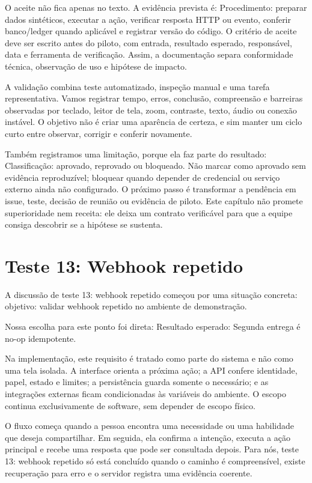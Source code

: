 \documentclass[12pt,oneside,a4paper,article]{abntex2}
\begin{document}
O aceite não fica apenas no texto. A evidência prevista é: Procedimento: preparar dados sintéticos, executar a ação, verificar resposta HTTP ou evento, conferir banco/ledger quando aplicável e registrar versão do código. O critério de aceite deve ser escrito antes do piloto, com entrada, resultado esperado, responsável, data e ferramenta de verificação. Assim, a documentação separa conformidade técnica, observação de uso e hipótese de impacto.

A validação combina teste automatizado, inspeção manual e uma tarefa representativa. Vamos registrar tempo, erros, conclusão, compreensão e barreiras observadas por teclado, leitor de tela, zoom, contraste, texto, áudio ou conexão instável. O objetivo não é criar uma aparência de certeza, e sim manter um ciclo curto entre observar, corrigir e conferir novamente.

Também registramos uma limitação, porque ela faz parte do resultado: Classificação: aprovado, reprovado ou bloqueado. Não marcar como aprovado sem evidência reproduzível; bloquear quando depender de credencial ou serviço externo ainda não configurado. O próximo passo é transformar a pendência em issue, teste, decisão de reunião ou evidência de piloto. Este capítulo não promete superioridade nem receita: ele deixa um contrato verificável para que a equipe consiga descobrir se a hipótese se sustenta.

\section{Teste 13: Webhook repetido}
A discussão de teste 13: webhook repetido começou por uma situação concreta: objetivo: validar webhook repetido no ambiente de demonstração.

Nossa escolha para este ponto foi direta: Resultado esperado: Segunda entrega é no-op idempotente.

Na implementação, este requisito é tratado como parte do sistema e não como uma tela isolada. A interface orienta a próxima ação; a API confere identidade, papel, estado e limites; a persistência guarda somente o necessário; e as integrações externas ficam condicionadas às variáveis do ambiente. O escopo continua exclusivamente de software, sem depender de escopo físico.

O fluxo começa quando a pessoa encontra uma necessidade ou uma habilidade que deseja compartilhar. Em seguida, ela confirma a intenção, executa a ação principal e recebe uma resposta que pode ser consultada depois. Para nós, teste 13: webhook repetido só está concluído quando o caminho é compreensível, existe recuperação para erro e o servidor registra uma evidência coerente.
\end{document}
